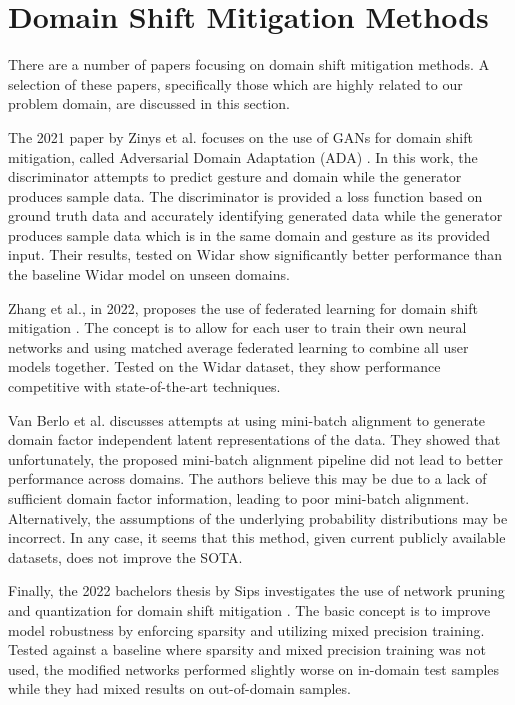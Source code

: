 \section{Domain Shift Mitigation Methods}

There are a number of papers focusing on domain shift mitigation methods.
A selection of these papers, specifically those which are highly related to our problem domain, are discussed in this section.

The 2021 paper by Zinys et al. focuses on the use of GANs for domain shift mitigation, called Adversarial Domain Adaptation (ADA) \cite{zinys2021domain}.
In this work, the discriminator attempts to predict gesture and domain while the generator produces sample data.
The discriminator is provided a loss function based on ground truth data and accurately identifying generated data while the generator produces sample data which is in the same domain and gesture as its provided input.
Their results, tested on Widar show significantly better performance than the baseline Widar model on unseen domains.

Zhang et al., in 2022, proposes the use of federated learning for domain shift mitigation \cite{zhang2022wifi}.
The concept is to allow for each user to train their own neural networks and using matched average federated learning to combine all user models together.
Tested on the Widar dataset, they show performance competitive with state-of-the-art techniques.

Van Berlo et al. discusses attempts at using mini-batch alignment to generate domain factor independent latent representations of the data.
They showed that unfortunately, the proposed mini-batch alignment pipeline did not lead to better performance across domains.
The authors believe this may be due to a lack of sufficient domain factor information, leading to poor mini-batch alignment.
Alternatively, the assumptions of the underlying probability distributions may be incorrect.
In any case, it seems that this method, given current publicly available datasets, does not improve the SOTA.

Finally, the 2022 bachelors thesis by Sips investigates the use of network pruning and quantization for domain shift mitigation \cite{sips2022impact}.
The basic concept is to improve model robustness by enforcing sparsity and utilizing mixed precision training.
Tested against a baseline where sparsity and mixed precision training was not used, the modified networks performed slightly worse on in-domain test samples while they had mixed results on out-of-domain samples.

